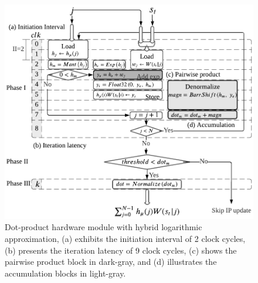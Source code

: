 \begin{figure}[h!]
	\centering
	\includegraphics[width=0.5\columnwidth]{./chapters/sbs_accelerator/figures/dot_product_log.pdf}
	\caption{Dot-product hardware module with hybrid logarithmic approximation, (a) exhibits the initiation interval of 2 clock cycles, (b) presents the iteration latency of 9 clock cycles, (c) shows the pairwise product block in dark-gray, and (d) illustrates the accumulation blocks in light-gray.}
	\label{fig:dot_product_log}
\end{figure}


